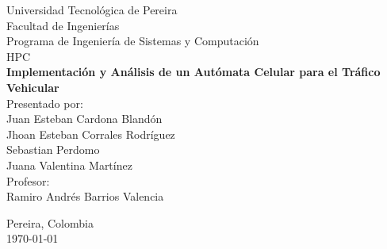 \begin{titlepage}
    \centering
    \vspace*{0.5cm}
    
    {\Large Universidad Tecnológica de Pereira}\\[0.5cm]
    {\large Facultad de Ingenierías}\\[0.3cm]
    {\large Programa de Ingeniería de Sistemas y Computación}\\[0.3cm]
    {\large HPC}\\[3cm]
    
    {\LARGE\textbf{Implementación y Análisis de un Autómata Celular para el Tráfico Vehicular}}\\[2cm]
        
    {\large Presentado por:}\\[0.3cm]
    {\large Juan Esteban Cardona Blandón}\\[0.3cm]
    {\large Jhoan Esteban Corrales Rodríguez}\\[0.3cm]
    {\large Sebastian Perdomo}\\[0.3cm]
    {\large Juana Valentina Martínez}\\[1cm]
    {\large Profesor:}\\[0.3cm]
    {\large Ramiro Andrés Barrios Valencia}\\[0.3cm]
        
    \vfill
    
    {\large Pereira, Colombia}\\[0.3cm]
    {\large \today}
    
\end{titlepage}